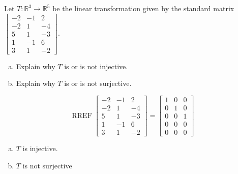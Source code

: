 
\begin{exerciseStatement}
 Let \(T:\mathbb{R}^ 3  \to \mathbb{R}^ 5 \) be the linear transformation given by the standard matrix \( \left[\begin{array}{ccc}
-2 & -1 & 2 \\
-2 & 1 & -4 \\
5 & 1 & -3 \\
1 & -1 & 6 \\
3 & 1 & -2
\end{array}\right] .\)
\begin{enumerate}[(a)]
\item Explain why \(T\) is or is not injective.
\item Explain why \(T\) is or is not surjective.
\end{enumerate}
    
\end{exerciseStatement}
    
\begin{exerciseAnswer} 


\[\operatorname{RREF} \left[\begin{array}{ccc}
-2 & -1 & 2 \\
-2 & 1 & -4 \\
5 & 1 & -3 \\
1 & -1 & 6 \\
3 & 1 & -2
\end{array}\right] = \left[\begin{array}{ccc}
1 & 0 & 0 \\
0 & 1 & 0 \\
0 & 0 & 1 \\
0 & 0 & 0 \\
0 & 0 & 0
\end{array}\right] \]


\begin{enumerate}[(a)]
\item \(T\) is injective.
\item \(T\) is not surjective
\end{enumerate}
    
\end{exerciseAnswer}
    
